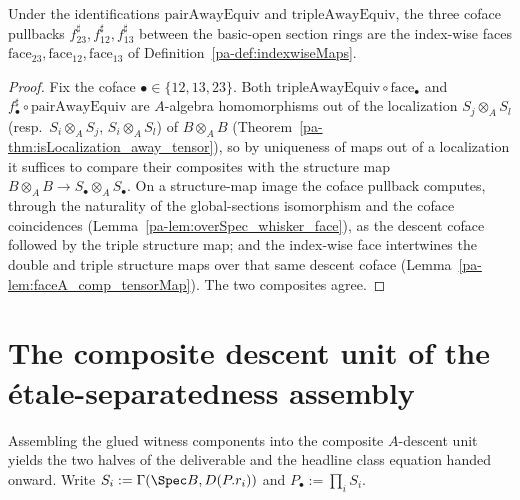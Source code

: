 \begin{lemma}
  \label{pa-lem:tripleAwayEquiv_faceA}
  \leanok

  Under the identifications \(\mathrm{pairAwayEquiv}\) and \(\mathrm{tripleAwayEquiv}\), the
  three coface pullbacks \(f_{23}^{\sharp}, f_{12}^{\sharp}, f_{13}^{\sharp}\) between the
  basic-open section rings are the index-wise faces \(\mathrm{face}_{23}, \mathrm{face}_{12},
  \mathrm{face}_{13}\) of Definition~\ref{pa-def:indexwiseMaps}.
\end{lemma}
\begin{proof}
  \leanok
  Fix the coface \(\bullet \in \{12, 13, 23\}\). Both \(\mathrm{tripleAwayEquiv} \circ
  \mathrm{face}_{\bullet}\) and \(f_{\bullet}^{\sharp} \circ \mathrm{pairAwayEquiv}\) are
  \(A\)-algebra homomorphisms out of the localization \(S_j \otimes_A S_l\) (resp.\ \(S_i
  \otimes_A S_j\), \(S_i \otimes_A S_l\)) of \(B \otimes_A B\)
  (Theorem~\ref{pa-thm:isLocalization_away_tensor}), so by uniqueness of maps out of a localization
  it suffices to compare their composites with the structure map \(B \otimes_A B \to S_\bullet
  \otimes_A S_\bullet\). On a structure-map image the coface pullback computes, through the
  naturality of the global-sections isomorphism and the coface coincidences
  (Lemma~\ref{pa-lem:overSpec_whisker_face}), as the descent coface followed by the triple
  structure map; and the index-wise face intertwines the double and triple structure maps over
  that same descent coface (Lemma~\ref{pa-lem:faceA_comp_tensorMap}). The two composites agree.
\end{proof}

\section{The composite descent unit of the \'etale-separatedness assembly}
\label{pa-sec:witnessAssembly}

Assembling the glued witness components into the composite \(A\)-descent unit yields the two
halves of the deliverable and the headline class equation handed onward. Write \(S_i :=
\Gamma(\Spec B, D(P.r_i))\) and \(P_{\!\bullet} := \prod_i S_i\).

